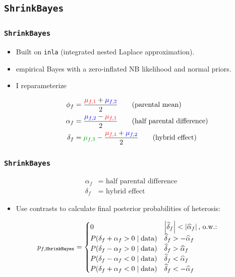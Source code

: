 \documentclass[handout]{beamer}
\providecommand{\wh}[1]{\widehat{#1}}
\numberwithin{equation}{section}
\begin{document}
\subsection{{\tt ShrinkBayes}}

\begin{frame}
\frametitle{{\tt ShrinkBayes}}
\begin{itemize}
\item Built on {\tt inla} (integrated nested Laplace approximation).
\pause \item empirical Bayes with a zero-inflated NB likelihood and normal priors.
\pause \item I reparameterize

\begin{align*}
\phi_f &= \frac{{\color{red}\mu_{f, 1}} + {\color{blue}\mu_{f, 2}}}{2} \qquad \text{(parental mean)} \\
\alpha_f &= \frac{{\color{blue}\mu_{f, 2}} - {\color{red}\mu_{f, 1}}}{2} \qquad \text{(half parental difference)} \\
\delta_f &= {\color{dkgreen}\mu_{f, 3}} - \frac{{\color{red}\mu_{f, 1}} + {\color{blue}\mu_{f, 2}}}{2} \qquad \text{(hybrid effect)} 
\end{align*}
\end{itemize}
\end{frame}

\begin{frame}
\frametitle{{\tt ShrinkBayes}}

\begin{align*}
\alpha_f &= \text{ half parental difference} \\
\delta_f &= \text{ hybrid effect}
\end{align*}

\begin{itemize}
\item Use contrasts to calculate final posterior probabilities of heterosis:

\end{itemize}


\begin{align*}
p_{f, \text{\tt ShrinkBayes}} &= \begin{cases}
0 & \left |\wh{\delta}_f  \right | < \left | \wh{\alpha}_f  \right | \text{, o.w.:} \\
P(\delta_f + \alpha_f > 0 \mid \text{data}) & \wh{\delta}_f > -\wh{\alpha}_f \\
P(\delta_f - \alpha_f > 0 \mid \text{data}) & \wh{\delta}_f > \wh{\alpha}_f \\
P(\delta_f - \alpha_f < 0 \mid \text{data}) & \wh{\delta}_f < \wh{\alpha}_f \\
P(\delta_f + \alpha_f < 0 \mid \text{data}) & \wh{\delta}_f < -\wh{\alpha}_f
\end{cases}
\end{align*}
\end{frame}
\end{document}
